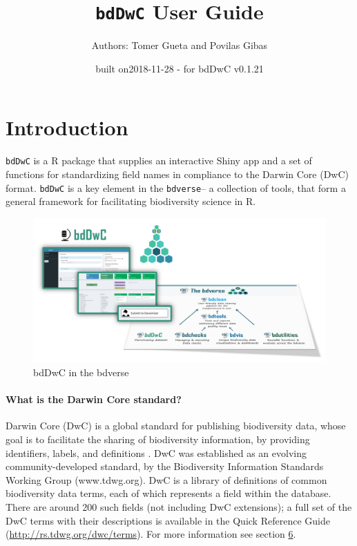 \documentclass[]{book}
\title{\texttt{bdDwC} User Guide}
\author{Authors: Tomer Gueta and Povilas Gibas}
\date{built on2018-11-28 - for bdDwC v0.1.21}
\theoremstyle{definition}
\theoremstyle{definition}
\theoremstyle{definition}
\theoremstyle{remark}
\begin{document}
\maketitle

{
\setcounter{tocdepth}{1}
\tableofcontents
}
\chapter*{Introduction}\label{introduction}

\texttt{bdDwC} is a R package that supplies an interactive Shiny app and
a set of functions for standardizing field names in compliance to the
Darwin Core (DwC) format. \texttt{bdDwC} is a key element in the
\texttt{bdverse}-- a collection of tools, that form a general framework
for facilitating biodiversity science in R.

\begin{figure}
\centering
\includegraphics{img/bdDwC_bdverse.png}
\caption{bdDwC in the bdverse}
\end{figure}

\subsubsection*{What is the Darwin Core
standard?}\label{what-is-the-darwin-core-standard}

Darwin Core (DwC) is a global standard for publishing biodiversity data,
whose goal is to facilitate the sharing of biodiversity information, by
providing identifiers, labels, and definitions \citep{DwC-paper}. DwC
was established as an evolving community-developed standard, by the
Biodiversity Information Standards Working Group (www.tdwg.org). DwC is
a library of definitions of common biodiversity data terms, each of
which represents a field within the database. There are around 200 such
fields (not including DwC extensions); a full set of the DwC terms with
their descriptions is available in the Quick Reference Guide
(\url{http://rs.tdwg.org/dwc/terms}). For more information see section
\protect\hyperlink{learn-more-about-darwin-core}{6}.
\end{document}
